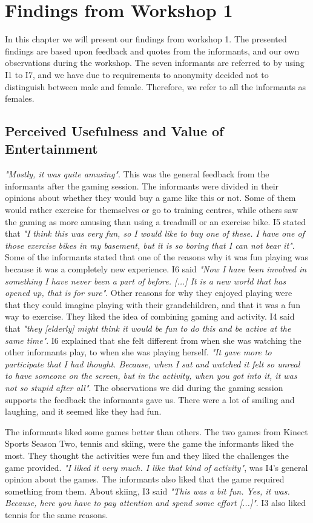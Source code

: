 \chapter{Findings from Workshop 1}
\label{chap:findW1}
In this chapter we will present our findings from workshop 1. The presented findings are based upon feedback and quotes from the informants, and our own observations during the workshop. The seven informants are referred to by using I1 to I7, and we have due to requirements to anonymity decided not to distinguish between male and female. Therefore, we refer to all the informants as females.  

\section{Perceived Usefulness and Value of Entertainment}
\emph{"Mostly, it was quite amusing"}. This was the general feedback from the informants after the gaming session. The informants were divided in their opinions about whether they would buy a game like this or not. Some of them would rather exercise for themselves or go to training centres, while others saw the gaming as more amusing than using a treadmill or an exercise bike. I5 stated that \emph{"I think this was very fun, so I would like to buy one of these. I have one of those exercise bikes in my basement, but it is so boring that I can not bear it"}.  Some of the informants stated that one of the reasons why it was fun playing was because it was a completely new experience. I6 said \emph{"Now I have been involved in something I have never been a part of before. [...] It is a new world that has opened up, that is for sure"}. Other reasons for why they enjoyed playing were that they could imagine playing with their grandchildren, and that it was a fun way to exercise. They liked the idea of combining gaming and activity. I4 said that \emph{"they [elderly] might think it would be fun to do this and be active at the same time"}. I6 explained that she felt different from when she was watching the other informants play, to when she was playing herself. \emph{"It gave more to participate that I had thought. Because, when I sat and watched it felt so unreal to have someone on the screen, but in the activity, when you got into it, it was not so stupid after all"}. The observations we did during the gaming session supports the feedback the informants gave us. There were a lot of smiling and laughing, and it seemed like they had fun.  

The informants liked some games better than others. The two games from Kinect Sports Season Two, tennis and skiing, were the game the informants liked the most. They thought the activities were fun and they liked the challenges the game provided. \emph{"I liked it very much. I like that kind of activity"}, was I4's general opinion about the games. The informants also liked that the game required something from them. About skiing, I3 said \emph{"This was a bit fun. Yes, it was. Because, here you have to pay attention and spend some effort [...]"}. I3 also liked tennis for the same reasons.  

